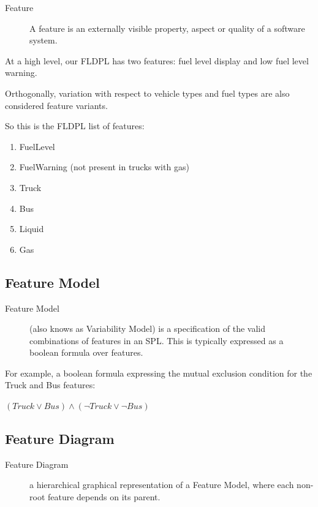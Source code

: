 \documentclass[11pt]{article}
\begin{document}
\begin{description}

\item[Feature]
A feature is an externally visible property, aspect or quality of a software system.

\end{description}

At a high level, our FLDPL has two features: fuel level display and low fuel level warning.

Orthogonally, variation with respect to vehicle types and fuel types are also considered feature variants. 

So this is the FLDPL list of features:

\begin{enumerate}
\item FuelLevel
\item FuelWarning (not present in trucks with gas)
\item Truck
\item Bus
\item Liquid
\item Gas
\end{enumerate}

\subsection{Feature Model}

\begin{description}

\item[Feature Model]
(also knows as Variability Model) is a specification of the valid combinations of features in an SPL. This is typically expressed as a boolean formula over features.

\end{description}

For example, a boolean formula expressing the mutual exclusion condition for the Truck and Bus features:

$(Truck \vee Bus) \wedge (\neg Truck \vee \neg Bus) $

\subsection{Feature Diagram}

\begin{description}

\item[Feature Diagram]
a hierarchical graphical representation of a Feature Model, where each non-root feature depends on its parent.

\end{description}
\end{document}
